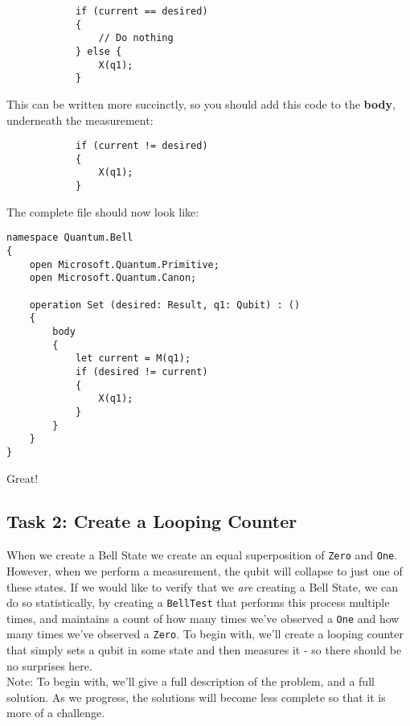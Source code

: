 \documentclass[a4paper]{article}
\begin{document}
    \begin{lstlisting}
            if (current == desired)
            {
                // Do nothing
            } else {
                X(q1);
            }
	\end{lstlisting}

This can be written more succinctly, so you should add this code to the \textbf{body}, underneath the measurement:

    \begin{lstlisting}
            if (current != desired)
            {
                X(q1);
            }
	\end{lstlisting}
    
The complete file should now look like:
    \begin{lstlisting}
namespace Quantum.Bell
{
    open Microsoft.Quantum.Primitive;
    open Microsoft.Quantum.Canon;

    operation Set (desired: Result, q1: Qubit) : ()
    {
        body
        {
            let current = M(q1);
            if (desired != current)
            {
                X(q1);
            }
        }
    }
}
	\end{lstlisting}
    
    Great!
    
    
\subsection{Task 2: Create a Looping Counter}
When we create a Bell State we create an equal superposition of \verb$Zero$ and \verb$One$. However, when we perform a measurement, the qubit will collapse to just one of these states. If we would like to verify that we \textit{are} creating a Bell State, we can do so statistically, by creating a \verb$BellTest$ that performs this process multiple times, and maintains a count of how many times we've observed a \verb$One$ and how many times we've observed a \verb$Zero$. To begin with, we'll create a looping counter that simply sets a qubit in some state and then measures it - so there should be no surprises here. \\

Note: To begin with, we'll give a full description of the problem, and a full solution. As we progress, the solutions will become less complete so that it is more of a challenge. 
\end{document}
